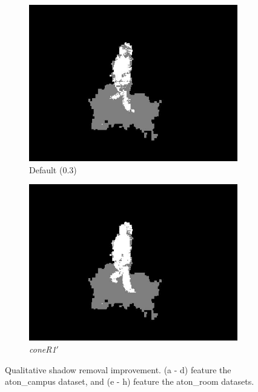 \begin{figure}
\begin{subfigure}{.24\linewidth}
  \includegraphics[width=1\linewidth]{figures/model/room_0275_default.jpg}
  \caption{Default (0.3)}
  \end{subfigure}
  \hfill
  \begin{subfigure}{.24\linewidth}
  \includegraphics[width=1\linewidth]{figures/model/room_0275_calc.jpg}
  \caption{\textit{coneR1}$'$}
  \end{subfigure}
  
\caption{Qualitative shadow removal improvement. (a - d) feature the aton\_campus dataset, and (e - h) feature the aton\_room datasets.}
\label{fig:qual_results}
\end{figure} 

